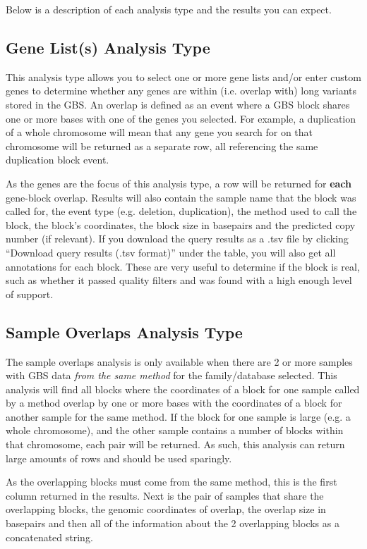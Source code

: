 \documentclass[11pt, a4paper]{article}
\begin{document}
Below is a description of each analysis type and the results you can expect.

\subsection{Gene List(s) Analysis Type}

This analysis type allows you to select one or more gene lists and/or enter custom genes to determine whether any genes are within (i.e. overlap with) long variants stored in the GBS. An overlap is defined as an event where a GBS block shares one or more bases with one of the genes you selected. For example, a duplication of a whole chromosome will mean that any gene you search for on that chromosome will be returned as a separate row, all referencing the same duplication block event.

As the genes are the focus of this analysis type, a row will be returned for \textbf{each} gene-block overlap. Results will also contain the sample name that the block was called for, the event type (e.g. deletion, duplication), the method used to call the block, the block's coordinates, the block size in basepairs and the predicted copy number (if relevant). If you download the query results as a .tsv file by clicking ``Download query results (.tsv format)'' under the table, you will also get all annotations for each block. These are very useful to determine if the block is real, such as whether it passed quality filters and was found with a high enough level of support. 

\subsection{Sample Overlaps Analysis Type}\label{sampleOverlapsAnalysisType}

The sample overlaps analysis is only available when there are 2 or more samples with GBS data \textit{from the same method} for the family/database selected. This analysis will find all blocks where the coordinates of a block for one sample called by a method overlap by one or more bases with the coordinates of a block for another sample for the same method. If the block for one sample is large (e.g. a whole chromosome), and the other sample contains a number of blocks within that chromosome, each pair will be returned. As such, this analysis can return large amounts of rows and should be used sparingly.

As the overlapping blocks must come from the same method, this is the first column returned in the results. Next is the pair of samples that share the overlapping blocks, the genomic coordinates of overlap, the overlap size in basepairs and then all of the information about the 2 overlapping blocks as a concatenated string.
\end{document}
